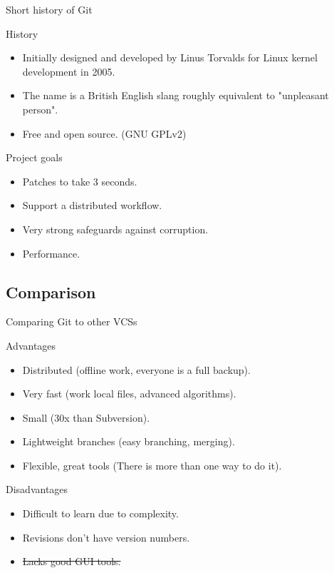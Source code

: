 \documentclass{beamer}
\begin{document}
\begin{frame}{Short history of Git}

\begin{block}{History}
\begin{itemize}
 \item Initially designed and developed by Linus Torvalds for Linux kernel development in 2005.
 \item The name is a British English slang roughly equivalent to "unpleasant person".
 \item Free and open source. (GNU GPLv2)
\end{itemize}
\end{block}

\begin{block}{Project goals}
\begin{itemize}
 \item Patches to take 3 seconds.
 \item Support a distributed workflow.
 \item Very strong safeguards against corruption.
 \item Performance.
\end{itemize}
\end{block}

\end{frame}


\subsection{Comparison}

\begin{frame}{Comparing Git to other VCSs}

\begin{block}{Advantages}
\begin{itemize}
 \item Distributed (offline work, everyone is a full backup).
 \item Very fast (work local files, advanced algorithms).
 \item Small (30x than Subversion).
 \item Lightweight branches (easy branching, merging).
 \item Flexible, great tools (There is more than one way to do it).
\end{itemize}
\end{block}

\begin{block}{Disadvantages}
\begin{itemize}
 \item Difficult to learn due to complexity.
 \item Revisions don't have version numbers.
 \item \sout{Lacks good GUI tools.}
\end{itemize}
\end{block}

\end{frame}
\end{document}

